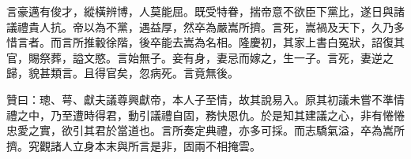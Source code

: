 \begin{pinyinscope}
言豪邁有俊才，縱橫辨博，人莫能屈。既受特眷，揣帝意不欲臣下黨比，遂日與諸議禮貴人抗。帝以為不黨，遇益厚，然卒為嚴嵩所擠。言死，嵩禍及天下，久乃多惜言者。而言所推轂徐階，後卒能去嵩為名相。隆慶初，其家上書白冤狀，詔復其官，賜祭葬，謚文愍。言始無子。妾有身，妻忌而嫁之，生一子。言死，妻逆之歸，貌甚類言。且得官矣，忽病死。言竟無後。

贊曰：璁、萼、獻夫議尊興獻帝，本人子至情，故其說易入。原其初議未嘗不準情禮之中，乃至遭時得君，動引議禮自固，務快恩仇。於是知其建議之心，非有惓惓忠愛之實，欲引其君於當道也。言所奏定典禮，亦多可採。而志驕氣溢，卒為嵩所擠。究觀諸人立身本末與所言是非，固兩不相掩雲。


\end{pinyinscope}